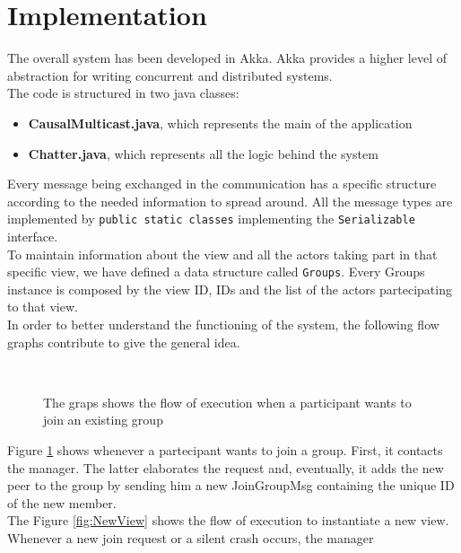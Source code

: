 \documentclass[conference]{IEEEtran}
\begin{document}
\section{Implementation}
The overall system has been developed in Akka. Akka provides a higher
level of abstraction for writing concurrent and distributed systems. \\
The code is structured in two java classes:
\begin{itemize}
	\item \textbf{CausalMulticast.java}, which represents the main of 
	the application 
	\item \textbf{Chatter.java}, which represents all the logic behind
	the system
\end{itemize}
Every message being exchanged in the communication has a specific
structure according to the needed information to spread around. 
All the message types are implemented by \texttt{public static classes}
implementing the \texttt{Serializable} interface.\\
To maintain information about the view and all the actors taking part
in that specific view, we have defined a data structure called \texttt{Groups}.
Every Groups instance is composed by the view ID, IDs and the list of the
actors partecipating to that view. \\
In order to better understand the functioning of the system, the 
following flow graphs contribute to give the general idea. \\
\begin{figure}[ht]%
	\centering
	\\%
	\caption{The graps shows the flow of execution when a participant
	wants to join an existing group}%
	\label{fig:join}%
\end{figure}
Figure \ref{fig:join} shows whenever a partecipant wants to join a 
group. First, it contacts the manager. The latter elaborates the
request and, eventually, it adds the new peer to the group by sending
him a new JoinGroupMsg containing the unique ID of the new member. \\
The Figure \ref{fig:NewView} shows the flow of execution to instantiate a new view.
Whenever a new join request or a silent crash occurs, the manager
\end{document}
